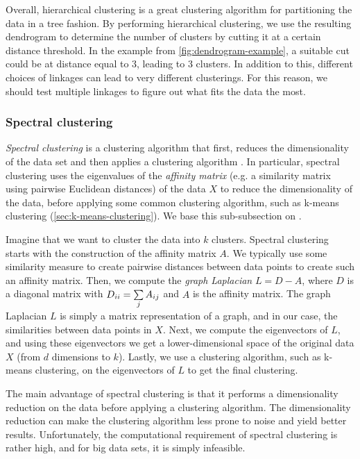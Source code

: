 Overall, hierarchical clustering is a great clustering algorithm for partitioning the data in a tree fashion. By performing hierarchical clustering, we use the resulting dendrogram to determine the number of clusters by cutting it at a certain distance threshold. In the example from \cref{fig:dendrogram-example}, a suitable cut could be at distance equal to 3, leading to 3 clusters. In addition to this, different choices of linkages can lead to very different clusterings. For this reason, we should test multiple linkages to figure out what fits the data the most.

\subsubsection{Spectral clustering}
\label{sec:spectral-clustering}
\textit{Spectral clustering} is a clustering algorithm that first, reduces the dimensionality of the data set and then applies a clustering algorithm \cite{Andrew2002}. In particular, spectral clustering uses the eigenvalues of the \textit{affinity matrix} (e.g. a similarity matrix using pairwise Euclidean distances) of the data $X$ to reduce the dimensionality of the data, before applying some common clustering algorithm, such as k-means clustering (\cref{sec:k-means-clustering}). We base this sub-subsection on \cite{Andrew2002}.

Imagine that we want to cluster the data into $k$ clusters. Spectral clustering starts with the construction of the affinity matrix $A$. We typically use some similarity measure to create pairwise distances between data points to create such an affinity matrix. Then, we compute the \textit{graph Laplacian} $L = D - A$, where $D$ is a diagonal matrix with $D_{ii} = \sum\limits_{j}^{} A_{ij}$ and $A$ is the affinity matrix. The graph Laplacian $L$ is simply a matrix representation of a graph, and in our case, the similarities between data points in $X$. Next, we compute the eigenvectors of $L$, and using these eigenvectors we get a lower-dimensional space of the original data $X$ (from $d$ dimensions to $k$). Lastly, we use a clustering algorithm, such as k-means clustering, on the eigenvectors of $L$ to get the final clustering.

The main advantage of spectral clustering is that it performs a dimensionality reduction on the data before applying a clustering algorithm. The dimensionality reduction can make the clustering algorithm less prone to noise and yield better results. Unfortunately, the computational requirement of spectral clustering is rather high, and for big data sets, it is simply infeasible.

